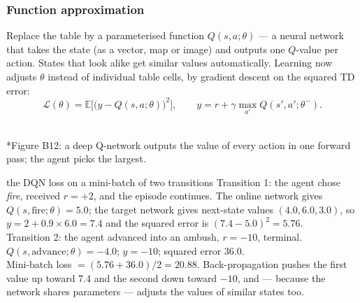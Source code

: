 \documentclass[11pt]{article}
\begin{document}
\subsubsection{Function approximation}
Replace the table by a parameterised function $Q(s,a;\theta)$ --- a neural network that takes the state (as a vector, map or image) and outputs one $Q$-value per action. States that look alike get similar values automatically. Learning now adjusts $\theta$ instead of individual table cells, by gradient descent on the squared TD error:
\[\mathcal L(\theta)=\mathbb E\Big[\big(y-Q(s,a;\theta)\big)^2\Big],\qquad y=r+\gamma\max_{a'}Q(s',a';\theta^-).\]
\begin{center}\\*{\small\color{GreyN}Figure B12: a deep Q-network outputs the value of every action in one forward pass; the agent picks the largest.}\end{center}
\begin{example}{the DQN loss on a mini-batch of two transitions}
Transition 1: the agent chose \emph{fire}, received $r=+2$, and the episode continues. The online network gives $Q(s,\text{fire};\theta)=5.0$; the target network gives next-state values $(4.0,6.0,3.0)$, so $y=2+0.9\times6.0=7.4$ and the squared error is $(7.4-5.0)^2=5.76$.\\
Transition 2: the agent advanced into an ambush, $r=-10$, terminal. $Q(s,\text{advance};\theta)=-4.0$; $y=-10$; squared error $36.0$.\\
Mini-batch loss $=(5.76+36.0)/2=20.88$. Back-propagation pushes the first value up toward 7.4 and the second down toward $-10$, and --- because the network shares parameters --- adjusts the values of similar states too.
\end{example}
\end{document}
